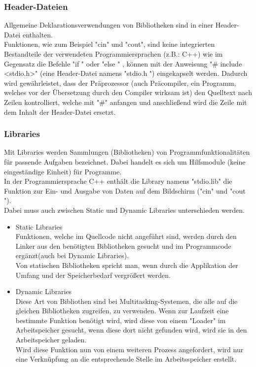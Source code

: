 \documentclass[12pt,a4paper]{report}
\begin{document}
\begin{onehalfspace}
\subsubsection{Header-Dateien}
Allgemeine Deklarationsverwendungen von Bibliotheken sind in einer Header-Datei enthalten.
\\Funktionen, wie zum Beispiel "{}cin"{} und "{}cout{}", sind keine integrierten Bestandteile der verwendeten Programmiersprachen (z.B.: C++) wie im Gegensatz die Befehle "{}if "{} oder "{}else "{} , können mit der Anweisung "{}\# include \textless stdio.h\textgreater "{} (eine Header-Datei namens "{}stdio.h "{}) eingekapselt werden. Dadurch wird gewährleistet, dass der Präprozessor (auch Präcompiler, ein Programm, welches vor der Übersetzung durch den Compiler wirksam ist) den Quelltext nach Zeilen kontrolliert, welche mit "{}\#"{} anfangen und anschließend wird die Zeile mit dem Inhalt der Header-Datei ersetzt.

\subsubsection{Libraries}
Mit Libraries werden Sammlungen (Bibliotheken) von Programmfunktionalitäten für passende Aufgaben bezeichnet. Dabei handelt es sich um Hilfsmodule (keine eingeständige Einheit) für Programme.\\
In der Programmiersprache C++ enthält die Library namens "{}stdio.lib"{} die Funktion zur Ein- und Ausgabe von Daten auf dem Bildschirm ("{}cin"{} und "{}cout "{}).\\
Dabei muss auch zwischen Static und Dynamic Libraries unterschieden werden.

\begin{itemize}
\item Static Libraries\\
Funktionen, welche im Quellcode nicht angeführt sind, werden durch den Linker aus den benötigten Bibliotheken gesucht und im Programmcode ergänzt(auch bei Dynamic Libraries).
\\Von statischen Bibliotheken spricht man, wenn durch die Applikation der Umfang und der Speicherbedarf vergrößert werden.
\item Dynamic Libraries\\
Diese Art von Bibliothen sind bei Multitasking-Systemen, die alle auf die gleichen Bibliotheken zugreifen, zu verwenden. Wenn zur Laufzeit eine bestimmte Funktion benötigt wird, wird diese von einem "{}Loader"{} im Arbeitspeicher gesucht, wenn diese dort nicht gefunden wird, wird sie in den Arbeitspeicher geladen.
\\Wird diese Funktion nun von einem weiteren Prozess angefordert, wird nur eine Verknüpfung an die entsprechende Stelle im Arbeitsspeicher erstellt.\\


\end{itemize}
\end{onehalfspace}
\end{document}
